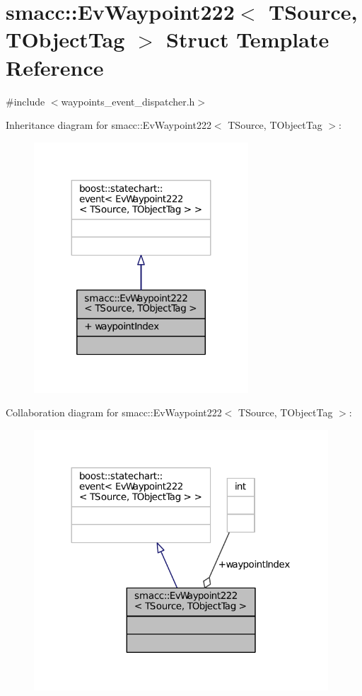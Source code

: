 \hypertarget{structsmacc_1_1EvWaypoint222}{}\section{smacc\+:\+:Ev\+Waypoint222$<$ T\+Source, T\+Object\+Tag $>$ Struct Template Reference}
\label{structsmacc_1_1EvWaypoint222}


{\ttfamily \#include $<$waypoints\+\_\+event\+\_\+dispatcher.\+h$>$}



Inheritance diagram for smacc\+:\+:Ev\+Waypoint222$<$ T\+Source, T\+Object\+Tag $>$\+:
\nopagebreak
\begin{figure}[H]
\begin{center}
\leavevmode
\includegraphics[width=227pt]{structsmacc_1_1EvWaypoint222__inherit__graph}
\end{center}
\end{figure}


Collaboration diagram for smacc\+:\+:Ev\+Waypoint222$<$ T\+Source, T\+Object\+Tag $>$\+:
\nopagebreak
\begin{figure}[H]
\begin{center}
\leavevmode
\includegraphics[width=312pt]{structsmacc_1_1EvWaypoint222__coll__graph}
\end{center}
\end{figure}
